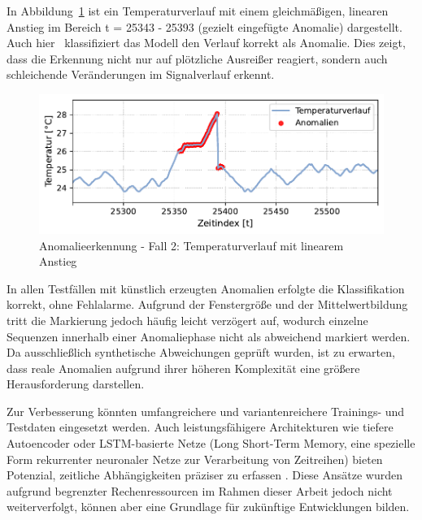 In Abbildung~\ref{fig:Fall2} ist ein Temperaturverlauf mit einem gleichmäßigen, linearen Anstieg im Bereich t = 25343 - 25393 (gezielt eingefügte Anomalie) dargestellt. 
Auch hier%
\pagebreak
~klassifiziert das Modell den Verlauf korrekt als Anomalie. 
Dies zeigt, dass die Erkennung nicht nur auf plötzliche Ausreißer reagiert, sondern auch schleichende Veränderungen im Signalverlauf erkennt.

\vspace{-0.75em}
\begin{figure}[htbp]
    \centering
        \includegraphics[width=1\textwidth]{Bilder/Ergebnisse/KI/Fall2.pdf}
        \vspace{-2em}
    \caption[Anomalieerkennung - Fall 2]{Anomalieerkennung - Fall 2: Temperaturverlauf mit linearem Anstieg}
    \label{fig:Fall2}
\end{figure}
\vspace{-0.75em}

In allen Testfällen mit künstlich erzeugten Anomalien erfolgte die Klassifikation korrekt, ohne Fehlalarme. 
Aufgrund der Fenstergröße und der Mittelwertbildung tritt die Markierung jedoch häufig leicht verzögert auf, wodurch einzelne Sequenzen innerhalb einer Anomaliephase nicht als abweichend markiert werden. 
Da ausschließlich synthetische Abweichungen geprüft wurden, ist zu erwarten, dass reale Anomalien aufgrund ihrer höheren Komplexität eine größere Herausforderung darstellen.

Zur Verbesserung könnten umfangreichere und variantenreichere Trainings- und Testdaten eingesetzt werden. 
Auch leistungsfähigere Architekturen wie tiefere Autoencoder oder LSTM-basierte Netze (Long Short-Term Memory, eine spezielle Form rekurrenter neuronaler Netze zur Verarbeitung von Zeitreihen) bieten Potenzial, zeitliche Abhängigkeiten präziser zu erfassen \cite{MALEKI2021107443}. 
Diese Ansätze wurden aufgrund begrenzter Rechenressourcen im Rahmen dieser Arbeit jedoch nicht weiterverfolgt, können aber eine Grundlage für zukünftige Entwicklungen bilden.

